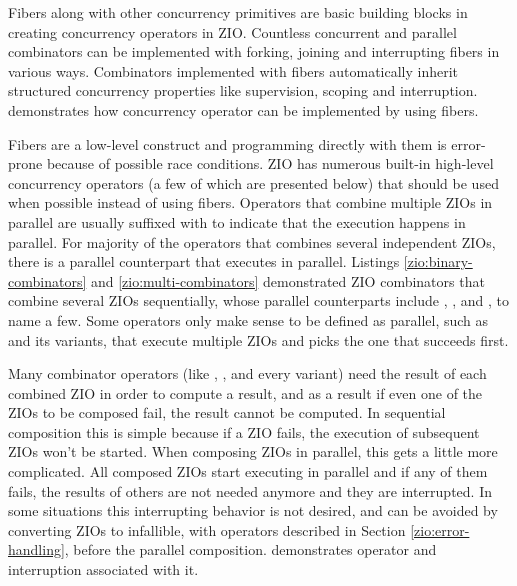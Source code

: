 Fibers along with other concurrency primitives are basic building blocks in creating concurrency operators in ZIO. Countless concurrent and parallel combinators can be implemented with forking, joining and interrupting fibers in various ways. Combinators implemented with fibers automatically inherit structured concurrency properties like supervision, scoping and interruption.  demonstrates how  concurrency operator can be implemented by using fibers.



Fibers are a low-level construct and programming directly with them is error-prone because of possible race conditions. ZIO has numerous built-in high-level concurrency operators (a few of which are presented below) that should be used when possible instead of using fibers. Operators that combine multiple ZIOs in parallel are usually suffixed with  to indicate that the execution happens in parallel. For majority of the operators that combines several independent ZIOs, there is a parallel counterpart that executes in parallel. Listings \ref{zio:binary-combinators} and \ref{zio:multi-combinators} demonstrated ZIO combinators that combine several ZIOs sequentially, whose parallel counterparts include , , and , to name a few. Some operators only make sense to be defined as parallel, such as  and its variants, that execute multiple ZIOs and picks the one that succeeds first.

Many combinator operators (like , , and every  variant) need the result of each combined ZIO in order to compute a result, and as a result if even one of the ZIOs to be composed fail, the result cannot be computed. In sequential composition this is simple because if a ZIO fails, the execution of subsequent ZIOs won't be started. When composing ZIOs in parallel, this gets a little more complicated. All composed ZIOs start executing in parallel and if any of them fails, the results of others are not needed anymore and they are interrupted. In some situations this interrupting behavior is not desired, and can be avoided by converting ZIOs to infallible, with operators described in Section \ref{zio:error-handling}, before the parallel composition.  demonstrates  operator and interruption associated with it.

